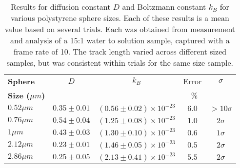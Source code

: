 \begin{table}[H]
\centering
\label{tab:results}
\begin{tabular}{||l|c|c|c|c||}
 \hline
 \bf Sphere & \textbf{$D$} & \bf $k_B$ & Error & $\sigma$ \\
    \bf Size ($\si{\mu m}$) &   &  &  \SI{}{\percent} & \\
 \hline
 \bf $0.52 \si{\mu m}$ & $0.35 \pm 0.01$ & $(0.56 \pm 0.02) \times10^{-23}$ & $6.0$ & $>10\sigma$ \\
 \bf $0.76 \si{\mu m}$ & $0.54 \pm 0.04$ & $(1.25 \pm 0.08) \times10^{-23}$ & $1.0$ & $2\sigma$\\
 \bf $1 \si{\mu m}$ & $0.43 \pm 0.03$ & $(1.30 \pm 0.10) \times10^{-23}$ & $0.6$ & $1\sigma$\\
 \bf $2.12 \si{\mu m}$ & $0.23 \pm 0.01$ & $(1.46 \pm 0.05) \times10^{-23}$ & $0.5$ & $2\sigma$\\
 \bf $2.86 \si{\mu m}$ & $0.25 \pm 0.05$ & $(2.13 \pm 0.41) \times10^{-23}$ & $5.5$ & $2\sigma$\\
 \hline
\end{tabular}
\caption{Results for diffusion constant $D$ and Boltzmann constant $k_B$ for various polystyrene sphere sizes. Each of these results is a mean value based on several trials. Each was obtained from measurement and analysis of a 15:1 water to solution sample, captured with a frame rate of 10. The track length varied across different sized samples, but was consistent within trials for the same size sample.}
\end{table}